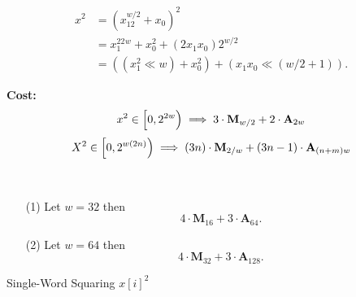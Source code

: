 \begin{note}
\begin{center}
\begin{minipage}{.6\textwidth}
\begin{tabular}{|c|c|c|c|}
\end{tabular}
\end{minipage}
\begin{minipage}{.25\textwidth}
\begin{align*}
x^2&=(x_12^{w/2}+x_0)^2\\
&=x_1^22^w + x_0^2 + (2x_1x_0)2^{w/2}\\
&=((x_1^2\ll w) + x_0^2) + (x_1x_0\ll (w/2+1)).
\end{align*}
\end{minipage}
\end{center}
\noindent\textbf{Cost:} \[
x^2\in\intco{0,2^{2w}}\implies 3\cdot\textbf{M}_{w/2} + 2\cdot\textbf{A}_{2w}
\] \[
X^2\in\intco{0,2^{w(2n)}}\implies(3n)\cdot\textbf{M}_{2/w} + (3n - 1)\cdot\textbf{A}_{(n+m)w}
\]
\end{note}
\vspace{8pt}
\begin{example}
\ \begin{itemize}
\item[(1)] Let $w=32$ then \[
4\cdot\textbf{M}_{16}+3\cdot\textbf{A}_{64}.
\]
\item[(2)] Let $w=64$ then \[
4\cdot\textbf{M}_{32}+3\cdot\textbf{A}_{128}.
\]
\end{itemize}
\end{example}

\begin{algorithm}[H]
\DontPrintSemicolon
\caption{Single-Word Squaring $x[i]^2$}
\BlankLine
{}
\BlankLine
{}
\end{algorithm}



